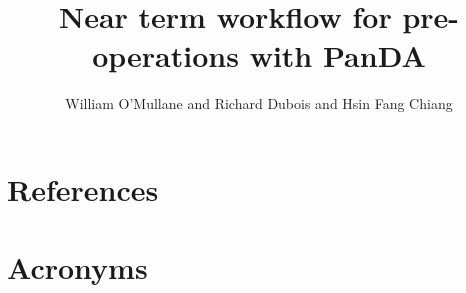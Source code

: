 \documentclass[lsstdraft,DM,authoryear,toc]{lsstdoc}
\title{Near term workflow for pre-operations with PanDA}
\author{%
William O'Mullane and Richard Dubois and Hsin Fang Chiang
}
\date{\vcsDate}
\begin{document}
\mkshorttitle


\appendix

\section{References} \label{sec:bib}
\renewcommand{\refname}{} %


\section{Acronyms} \label{sec:acronyms}

\end{document}
